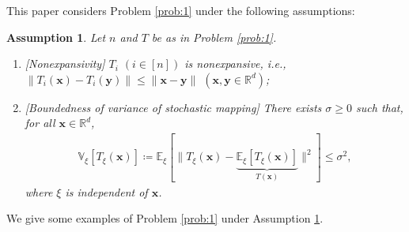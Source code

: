\documentclass[smallextended,referee,envcountsect,]{svjour3}
\newtheorem{assumption}{Assumption}[section]
\begin{document}
This paper considers Problem \ref{prob:1} under the following assumptions:

\begin{assumption}\label{assum:1}
Let $n$ and $T$ be as in Problem \ref{prob:1}.
\begin{enumerate}
\item[{\em (A1)}] {\em [Nonexpansivity]} $T_i$ $(i\in [n])$ is nonexpansive, i.e., $\|T_i (\bm{x}) - T_i (\bm{y})\| \leq \|\bm{x} - \bm{y}\|$ $(\bm{x}, \bm{y} \in \mathbb{R}^d)$;
\item[{\em (A2)}] {\em [Boundedness of variance of stochastic mapping]} There exists $\sigma \geq 0$ such that, for all $\bm{x} \in \mathbb{R}^{d}$, 
\begin{align*}
\mathbb{V}_{\xi}[T_{\xi}(\bm{x})] \coloneqq \mathbb{E}_{\xi}[\| T_{\xi}(\bm{x}) - \underbrace{\mathbb{E}_{\xi}[T_{\xi}(\bm{x})]}_{T (\bm{x})} \|^2] \leq \sigma^{2},
\end{align*}
where $\xi$ is independent of $\bm{x}$.
\end{enumerate}
\end{assumption}

We give some examples of Problem \ref{prob:1} under Assumption \ref{assum:1}.
\end{document}
